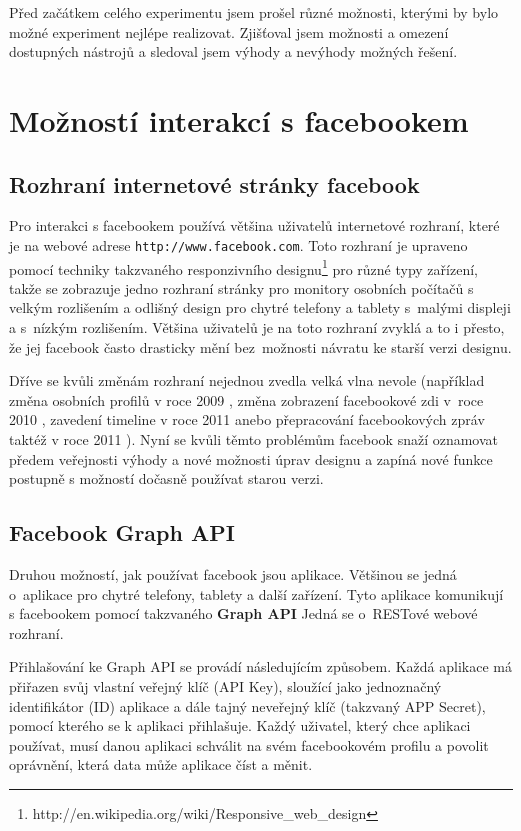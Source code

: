 \documentclass[thesis=M,czech]{FITthesis}[2013/05/10]
\begin{document}
Před začátkem celého experimentu jsem prošel různé možnosti, kterými by bylo možné experiment nejlépe realizovat. Zjišťoval jsem možnosti a omezení dostupných nástrojů a sledoval jsem výhody a nevýhody možných řešení. 

\section{Možností interakcí s facebookem}

\subsection{Rozhraní internetové stránky facebook}
Pro interakci s facebookem používá většina uživatelů internetové rozhraní, které je na webové adrese \verb|http://www.facebook.com|. Toto rozhraní je upraveno pomocí techniky takzvaného responzivního designu\footnote{http://en.wikipedia.org/wiki/Responsive\_web\_design} pro různé typy zařízení, takže se zobrazuje jedno rozhraní stránky pro monitory osobních počítačů s velkým rozlišením a odlišný design pro chytré telefony a tablety s~malými displeji a s~nízkým rozlišením. Většina uživatelů je na toto rozhraní zvyklá a to i přesto, že jej facebook často drasticky mění bez~možnosti návratu ke starší verzi designu. 

Dříve se kvůli změnám rozhraní nejednou zvedla velká vlna nevole (například změna osobních profilů v roce 2009 \cite{web:fbNewHomePage}, změna zobrazení facebookové zdi v~roce  2010 \cite{web:fbNewNavigation}, zavedení timeline v roce 2011 \cite{web:fbNewTimeline} anebo přepracování facebookových zpráv taktéž v roce 2011 \cite{web:fbNewMessages}). Nyní se kvůli těmto problémům facebook snaží oznamovat předem veřejnosti výhody a nové možnosti úprav designu a zapíná nové funkce postupně s možností dočasně používat starou verzi.  

\subsection{Facebook Graph API}
Druhou možností, jak používat facebook jsou aplikace. Většinou se jedná o~aplikace pro chytré telefony, tablety a další zařízení. Tyto aplikace komunikují s facebookem pomocí takzvaného \textbf{Graph API} \cite{web:fbGraphApi} Jedná se o~RESTové webové rozhraní.

Přihlašování ke Graph API se provádí následujícím způsobem. Každá aplikace má přiřazen svůj vlastní veřejný klíč (API Key), sloužící jako jednoznačný identifikátor (ID) aplikace a dále tajný neveřejný klíč (takzvaný APP Secret), pomocí kterého se k aplikaci přihlašuje. Každý uživatel, který chce aplikaci používat, musí danou aplikaci schválit na svém facebookovém profilu a povolit oprávnění, která data může aplikace číst a měnit.
\end{document}
